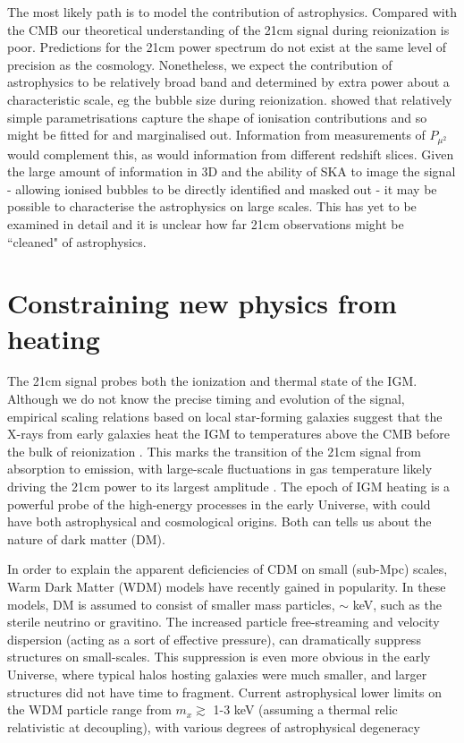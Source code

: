 \documentclass{PoS}
\begin{document}
The most likely path is to model the contribution of astrophysics. Compared with the CMB our theoretical understanding of the 21cm signal during reionization is poor. Predictions for the 21cm power spectrum do not exist at the same level of precision as the cosmology. Nonetheless, we expect the contribution of astrophysics to be relatively broad band and determined by extra power about a characteristic scale, eg the bubble size during reionization. \cite{2008PhRvD..78b3529M} showed that relatively simple parametrisations capture the shape of ionisation contributions and so might be fitted for and marginalised out. Information from measurements of $P_{\mu^2}$ would complement this, as would information from different redshift slices. Given the large amount of information in 3D and the ability of SKA to image the signal - allowing ionised bubbles to be directly identified and masked out - it may be possible to characterise the astrophysics on large scales. This has yet to be examined in detail and it is unclear how far 21cm observations might be ``cleaned" of astrophysics.

\section{Constraining new physics from heating}
\label{sec:heating}

The 21cm signal probes both the ionization and thermal state of the IGM.  Although we do not know the precise timing and evolution of the signal, empirical scaling relations based on local star-forming galaxies \cite[e.g.][]{2012MNRAS.419.2095M} suggest that the X-rays from early galaxies heat the IGM to temperatures above the CMB before the bulk of reionization \cite[e.g.][]{2006MNRAS.371..867F,2012ApJ...760....3M}.  This marks the transition of the 21cm signal from absorption to emission, with large-scale fluctuations in gas temperature likely driving the 21cm power to its largest amplitude \cite[e.g.][]{2007MNRAS.376.1680P,2010A&A...523A...4B}.  The epoch of IGM heating is a powerful probe of the high-energy processes in the early Universe, with could have both astrophysical and cosmological origins.  Both can tells us about the nature of dark matter (DM).

In order to explain the apparent deficiencies of CDM on small (sub-Mpc) scales, Warm Dark Matter (WDM) models have recently gained in popularity.  In these models, DM is assumed to consist of smaller mass particles, $\sim$ keV, such as the sterile neutrino or gravitino.  The increased particle free-streaming and velocity dispersion (acting as a sort of effective pressure), can dramatically suppress structures on small-scales.  This suppression is even more obvious in the early Universe, where typical halos hosting galaxies were much smaller, and larger structures did not have time to fragment.  Current astrophysical lower limits on the WDM particle range from $m_x \gtrsim$ 1-3 keV (assuming a thermal relic relativistic at decoupling), with various degrees of astrophysical degeneracy \cite[e.g.][]{2013MNRAS.432.3218D,2013ApJ...767...22K,2014MNRAS.443..678P,2013PhRvD..88d3502V}
\end{document}
